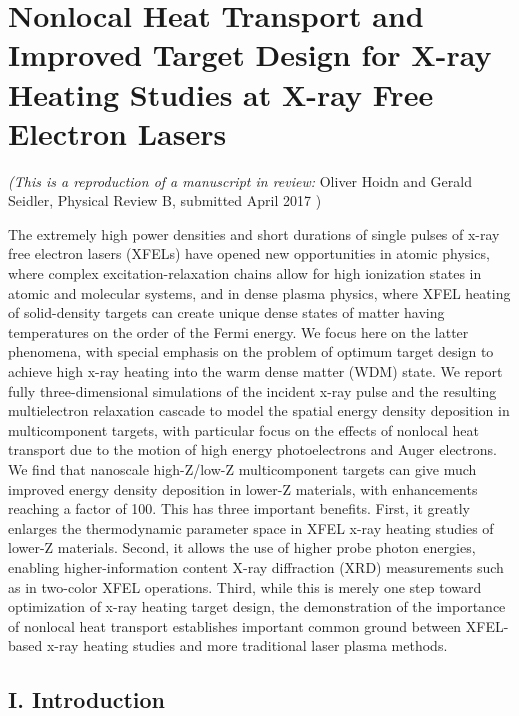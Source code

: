 
\chapter{Nonlocal Heat Transport and Improved Target Design for X-ray Heating Studies at X-ray Free Electron Lasers}
\label{chap:hef_chapter}

\emph{(This is a reproduction of a manuscript in review: }
Oliver Hoidn and Gerald Seidler, 
Physical Review B, submitted April 2017
)

\begin{addmargin}[2.5em]{2.5em}
The extremely high power densities and short durations of single pulses
of x-ray free electron lasers (XFELs) have opened new opportunities in
atomic physics, where complex excitation-relaxation chains allow for
high ionization states in atomic and molecular systems, and in dense
plasma physics, where XFEL heating of solid-density targets can create
unique dense states of matter having temperatures on the order of the
Fermi energy. We focus here on the latter phenomena, with special
emphasis on the problem of optimum target design to achieve high x-ray
heating into the warm dense matter (WDM) state. We report fully
three-dimensional simulations of the incident x-ray pulse and the
resulting multielectron relaxation cascade to model the spatial energy
density deposition in multicomponent targets, with particular focus on
the effects of nonlocal heat transport due to the motion of high energy
photoelectrons and Auger electrons. We find that nanoscale high-Z/low-Z
multicomponent targets can give much improved energy density deposition
in lower-Z materials, with enhancements reaching a factor of 100. This
has three important benefits. First, it greatly enlarges the
thermodynamic parameter space in XFEL x-ray heating studies of lower-Z
materials. Second, it allows the use of higher probe photon energies,
enabling higher-information content X-ray diffraction (XRD) measurements
such as in two-color XFEL operations. Third, while this is merely one
step toward optimization of x-ray heating target design, the
demonstration of the importance of nonlocal heat transport establishes
important common ground between XFEL-based x-ray heating studies and
more traditional laser plasma methods.
\end{addmargin}


\section{I. Introduction}

